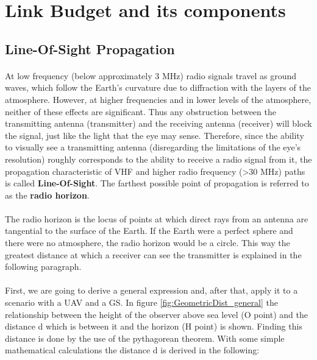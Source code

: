 \section{Link Budget and its components}\label{sec:link_budget}

\subsection{Line-Of-Sight Propagation}\label{subsec:los_propagation}
\paragraph{}At low frequency (below approximately 3 MHz) radio signals travel as ground waves, which follow the Earth's curvature due to diffraction with the layers of the atmosphere.
However, at higher frequencies and in lower levels of the atmosphere, neither of these effects are significant. Thus any obstruction between the transmitting antenna (transmitter) and the receiving antenna (receiver) will block the signal, just like the light that the eye may sense. Therefore, since the ability to visually see a transmitting antenna (disregarding the limitations of the eye's resolution) roughly corresponds to the ability to receive a radio signal from it, the propagation characteristic of VHF and higher radio frequency (>30 MHz) paths is called \textbf{Line-Of-Sight}. The farthest possible point of propagation is referred to as the \textbf{radio horizon}.

\paragraph{}The radio horizon is the locus of points at which direct rays from an antenna are tangential to the surface of the Earth. If the Earth were a perfect sphere and there were no atmosphere, the radio horizon would be a circle.
This way the greatest distance at which a receiver can see the transmitter is explained in the following paragraph.

\paragraph{}First, we are going to derive a general expression and, after that, apply it to a scenario with a UAV and a GS. In figure  \ref{fig:GeometricDist_general} the relationship between the height of the observer above sea level (O point) and the distance d which is between it and the horizon (H point) is shown. Finding this distance is done by the use of the pythagorean theorem. With some simple mathematical calculations the distance d is derived in the following:

